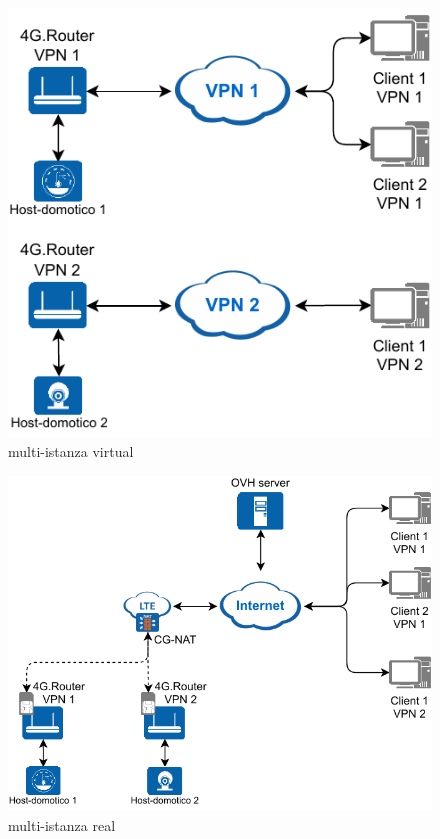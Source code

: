 \begin{figure}[h]
    \centering
    \includegraphics[width=0.6\linewidth]{immagini/diag2-multiistanza_virtual}
    \caption{multi-istanza virtual}
    \label{fig:diag2-multiistanza_virtual}
\end{figure}


\begin{figure}
    \centering
    \includegraphics[width=0.8\linewidth]{immagini/diag2-multiistanza_real}
    \caption{multi-istanza real}
    \label{fig:diag2-multiistanza_real}
\end{figure}



